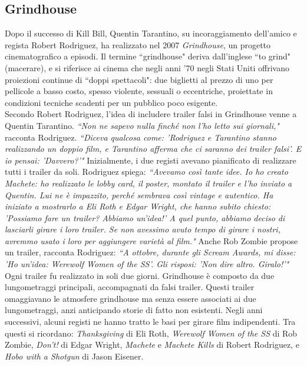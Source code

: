 \documentclass[12pt]{article} %
\begin{document}
\subsection{Grindhouse}
\begin{flushleft}
    Dopo il successo di Kill Bill, Quentin Tarantino, su incoraggiamento dell'amico e regista Robert Rodriguez, ha realizzato nel 2007 \textit{Grindhouse}, un progetto cinematografico a episodi. Il termine ``grindhouse" deriva dall'inglese ``to grind" (macerare), e si riferisce ai cinema che negli anni '70 negli Stati Uniti offrivano proiezioni continue di ``doppi spettacoli": due biglietti al prezzo di uno per pellicole a basso costo, spesso violente, sessuali o eccentriche, proiettate in condizioni tecniche scadenti per un pubblico poco esigente. 
    \\\vspace{1cm}
    Secondo Robert Rodriguez, l'idea di includere trailer falsi in Grindhouse venne a Quentin Tarantino. \textit{``Non ne sapevo nulla finché non l'ho letto sui giornali,"} racconta Rodriguez. \textit{``Diceva qualcosa come: 'Rodriguez e Tarantino stanno realizzando un doppio film, e Tarantino afferma che ci saranno dei trailer falsi'. E io pensai: 'Davvero?'"} 
    Inizialmente, i due registi avevano pianificato di realizzare tutti i trailer da soli. Rodriguez spiega: \textit{``Avevamo così tante idee. Io ho creato Machete: ho realizzato le lobby card, il poster, montato il trailer e l’ho inviato a Quentin. Lui ne è impazzito, perché sembrava così vintage e autentico. Ha iniziato a mostrarlo a Eli Roth e Edgar Wright, che hanno subito chiesto: 'Possiamo fare un trailer? Abbiamo un'idea!' A quel punto, abbiamo deciso di lasciarli girare i loro trailer. Se non avessimo avuto tempo di girare i nostri, avremmo usato i loro per aggiungere varietà al film."} 
    Anche Rob Zombie propose un trailer, racconta Rodriguez: \textit{``A ottobre, durante gli Scream Awards, mi disse: 'Ho un’idea: Werewolf Women of the SS'. Gli risposi: 'Non dire altro. Giralo!'"}
    Ogni trailer fu realizzato in soli due giorni.
    Grindhouse è composto da due lungometraggi principali, accompagnati da falsi trailer. Questi trailer omaggiavano le atmosfere grindhouse ma senza essere associati ai due lungometraggi, anzi anticipando storie di fatto non esistenti. Negli anni successivi, alcuni registi ne hanno tratto le basi per girare film indipendenti. Tra questi si ricordano: \textit{Thanksgiving} di Eli Roth, \textit{Werewolf Women of the SS} di Rob Zombie, \textit{Don't!} di Edgar Wright, \textit{Machete} e \textit{Machete Kills} di Robert Rodriguez, e \textit{Hobo with a Shotgun} di Jason Eisener.

\end{flushleft}
\end{document}
